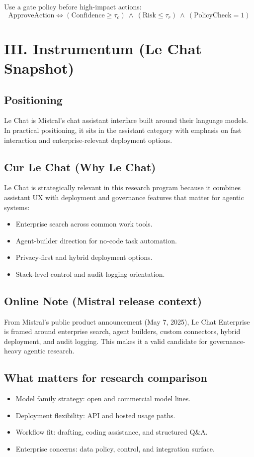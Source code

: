 \documentclass[10pt]{article}
\begin{document}
Use a gate policy before high-impact actions:
\[
\text{ApproveAction} \iff (\text{Confidence} \ge \tau_c)\ \land\ (\text{Risk} \le \tau_r)\ \land\ (\text{PolicyCheck} = 1)
\]

\section*{III. Instrumentum (Le Chat Snapshot)}

\subsection*{Positioning}
Le Chat is Mistral's chat assistant interface built around their language models.
In practical positioning, it sits in the assistant category with emphasis on fast interaction and enterprise-relevant deployment options.

\subsection*{Cur Le Chat (Why Le Chat)}
Le Chat is strategically relevant in this research program because it combines assistant UX with deployment and governance features that matter for agentic systems:
\begin{itemize}
  \item Enterprise search across common work tools.
  \item Agent-builder direction for no-code task automation.
  \item Privacy-first and hybrid deployment options.
  \item Stack-level control and audit logging orientation.
\end{itemize}

\subsection*{Online Note (Mistral release context)}
From Mistral's public product announcement (May 7, 2025), Le Chat Enterprise is framed around enterprise search, agent builders, custom connectors, hybrid deployment, and audit logging.
This makes it a valid candidate for governance-heavy agentic research.

\subsection*{What matters for research comparison}
\begin{itemize}
  \item Model family strategy: open and commercial model lines.
  \item Deployment flexibility: API and hosted usage paths.
  \item Workflow fit: drafting, coding assistance, and structured Q\&A.
  \item Enterprise concerns: data policy, control, and integration surface.
\end{itemize}
\end{document}
